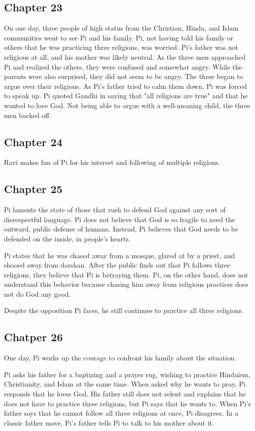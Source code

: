 \documentclass[11pt]{article}
\begin{document}
\subsection{Chapter 23}
\label{sec:orgd628211}
On one day, three people of high status from the Christian, Hindu, and Islam communities went to see Pi and his family. Pi, not having told his family or others that he was practicing three religions, was worried. Pi's father was not religious at all, and his mother was likely neutral. As the three men approached Pi and realized the others, they were confused and somewhat angry. While the parents were also surprised, they did not seem to be angry. The three began to argue over their religions. As Pi's father tried to calm them down, Pi was forced to speak up. Pi quoted Gandhi in saying that "all religions are true" and that he wanted to love God. Not being able to argue with a well-meaning child, the three men backed off.
\subsection{Chapter 24}
\label{sec:org439e3e1}
Ravi makes fun of Pi for his interest and following of multiple religions.
\subsection{Chapter 25}
\label{sec:org19d7b2c}
Pi laments the state of those that rush to defend God against any sort of disrespectful language. Pi does not believe that God is so fragile to need the outward, public defense of humans. Instead, Pi believes that God needs to be defended on the inside, in people's hearts.

Pi states that he was chased away from a mosque, glared at by a priest, and shooed away from darshan. After the public finds out that Pi follows three religions, they believe that Pi is betraying them. Pi, on the other hand, does not understand this behavior because chasing him away from religious practices does not do God any good.

Despite the opposition Pi faces, he still continues to practice all three religions.
\subsection{Chatper 26}
\label{sec:org5a4989b}
One day, Pi works up the courage to confront his family about the situation.

Pi asks his father for a baptizing and a prayer rug, wishing to practice Hinduism, Christianity, and Islam at the same time. When asked why he wants to pray, Pi responds that he loves God. His father still does not relent and explains that he does not have to practice three religions, but Pi says that he wants to. When Pi's father says that he cannot follow all three religions at once, Pi disagrees. In a classic father move, Pi's father tells Pi to talk to his mother about it.
\end{document}
